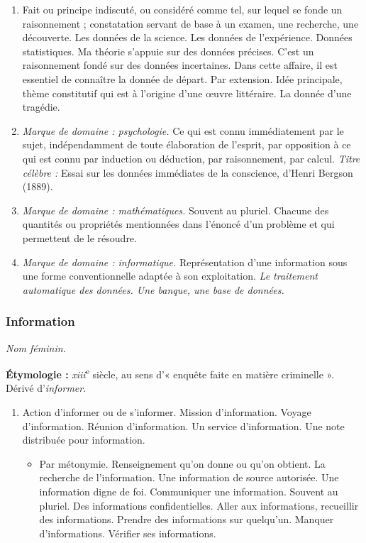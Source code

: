 \begin{graybox}
    \begin{enumerate}
        \item Fait ou principe indiscuté, ou considéré comme tel, sur lequel
        se fonde un raisonnement ; constatation servant de base à un examen,
        une recherche, une découverte. Les données de la science. Les données
        de l'expérience. Données statistiques. Ma théorie s'appuie sur des
        données précises. C'est un raisonnement fondé sur des données
        incertaines. Dans cette affaire, il est essentiel de connaître la
        donnée de départ. Par extension. Idée principale, thème constitutif
        qui est à l'origine d'une œuvre littéraire. La donnée d'une tragédie.

        \item \textit{Marque de domaine : psychologie.} Ce qui est connu
        immédiatement par le sujet, indépendamment de toute élaboration de
        l'esprit, par opposition à ce qui est connu par induction ou déduction,
        par raisonnement, par calcul. \textit{Titre célèbre :} Essai sur les
        données immédiates de la conscience, d'Henri Bergson (1889).

        \item \textit{Marque de domaine : mathématiques.} Souvent au pluriel.
        Chacune des quantités ou propriétés mentionnées dans l'énoncé d'un
        problème et qui permettent de le résoudre.

        \item \textit{Marque de domaine : informatique.} Représentation d'une
        information sous une forme conventionnelle adaptée à son exploitation.
        \textit{Le traitement automatique des données. Une banque, une base de
        données.}
    \end{enumerate}

    \subsubsection{Information}

    \textit{Nom féminin.} \parencite{acfr_information}

    \textbf{Étymologie :} \textit{xiii}\textsuperscript{e} siècle, au sens
    d'« enquête faite en matière criminelle ». Dérivé d'\textit{informer}.

    \begin{enumerate}
        \item Action d'informer ou de s'informer. Mission d'information.
        Voyage d'information. Réunion d'information. Un service d'information.
        Une note distribuée pour information.
        \begin{itemize}
            \item Par métonymie. Renseignement qu'on donne ou qu'on obtient.
            La recherche de l'information. Une information de source autorisée.
            Une information digne de foi. Communiquer une information. Souvent
            au pluriel. Des informations confidentielles. Aller aux
            informations, recueillir des informations. Prendre des informations
            sur quelqu'un. Manquer d'informations. Vérifier ses informations.


\end{itemize}
\end{enumerate}
\end{graybox}
